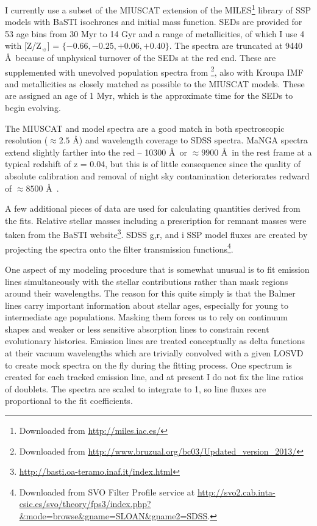 \documentclass[modern]{aastex62}
\begin{document}
I currently use a subset of the MIUSCAT extension of the MILES\footnote{Downloaded from \url{http://miles.iac.es/}} library of SSP models \citep{2010MNRAS.404.1639V, 2012MNRAS.424..157V} with BaSTI isochrones \citep[][and references therein]{2009ApJ...690..427P} and \citet{2001MNRAS.322..231K} initial mass function. SEDs are provided for 53 age bins from 30 Myr to 14 Gyr and a range of metallicities, of which I use 4 with [Z/Z$_\sun$] = $\{-0.66, -0.25, +0.06, +0.40\}$. The spectra are truncated at 9440 \AA~because of unphysical turnover of the SEDs at the red end. These are supplemented with unevolved population spectra from \footnote{Downloaded from \url{http://www.bruzual.org/bc03/Updated_version_2013/}}, also with Kroupa IMF and metallicities as closely matched as possible to the MIUSCAT models. These are assigned an age of 1 Myr, which is the approximate time for the  SEDs to begin evolving. 

The MIUSCAT and  model spectra are a good match in both spectroscopic resolution ($\approx 2.5$ \AA) and wavelength coverage to SDSS spectra. MaNGA spectra extend slightly farther into the red -- 10300 \AA~or $\approx 9900$ \AA~in the rest frame at a typical redshift of z = 0.04, but this is of little consequence since the quality of absolute calibration and removal of night sky contamination deteriorates redward of $\approx 8500$ \AA~\citep{2016AJ....152...83L}.

A few additional pieces of data are used for calculating quantities derived from the fits. Relative stellar masses including a prescription for remnant masses were taken from the BaSTI website\footnote{\url{http://basti.oa-teramo.inaf.it/index.html}}. SDSS g,r, and i SSP model fluxes are created by projecting the spectra onto the filter transmission functions\footnote{Downloaded from SVO Filter Profile service at \url{http://svo2.cab.inta-csic.es/svo/theory/fps3/index.php?&mode=browse&gname=SLOAN&gname2=SDSS}.}.

One aspect of my modeling procedure that is somewhat unusual \citep[but see][]{2006MNRAS.366.1151S, 2014ApJ...780...33C, 2015MNRAS.448.3484M} is to fit emission lines simultaneously with the stellar contributions rather than mask regions around their wavelengths. The reason for this quite simply is that the Balmer lines carry important information about stellar ages, especially for young to intermediate age populations. Masking them forces us to rely on continuum shapes and weaker or less sensitive absorption lines to constrain recent evolutionary histories. Emission lines are treated conceptually as delta functions at their vacuum wavelengths which are trivially convolved with a given LOSVD to create mock spectra on the fly during the fitting process. One spectrum is created for each tracked emission line, and at present I do not fix the line ratios of doublets. The spectra are scaled to integrate to 1, so line fluxes are proportional to the fit coefficients.
\end{document}
